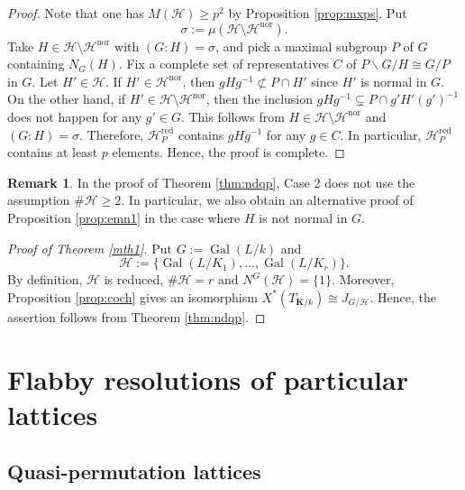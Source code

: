 \documentclass[12pt]{amsart}
\theoremstyle{plain}
\theoremstyle{definition}
\newtheorem{rem}[thm]{Remark}
\numberwithin{thm}{section}
\numberwithin{equation}{section}
\newcommand{\bK}{\mathbf{K}}
\newcommand{\cH}{\mathcal{H}}
\DeclareMathOperator{\Gal}{Gal}
\DeclareMathOperator{\red}{red}
\DeclareMathOperator{\nor}{nor}
\begin{document}
\begin{proof}
Note that one has $M(\cH)\geq p^{2}$ by Proposition \ref{prop:mxps}. Put
\begin{equation*}
\sigma:=\mu(\cH\setminus \cH^{\nor}). 
\end{equation*}
Take $H\in \cH \setminus \cH^{\nor}$ with $(G:H)=\sigma$, and pick a maximal subgroup $P$ of $G$ containing $N_{G}(H)$. Fix a complete set of representatives $C$ of $P\backslash G/H\cong G/P$ in $G$. Let $H'\in \cH$. If $H'\in \cH^{\nor}$, then $gHg^{-1}\not\subset P\cap H'$ since $H'$ is normal in $G$. On the other hand, if $H'\in \cH \setminus \cH^{\nor}$, then the inclusion $gHg^{-1}\subsetneq P\cap g'H'(g')^{-1}$ does not happen for any $g'\in G$. This follows from $H\in \cH \setminus \cH^{\nor}$ and $(G:H)=\sigma$. Therefore, $\cH_{P}^{\red}$ contains $gHg^{-1}$ for any $g\in C$. In particular, $\cH_{P}^{\red}$ contains at least $p$ elements. Hence, the proof is complete.  
\end{proof}

\begin{rem}
In the proof of Theorem \ref{thm:ndqp}, Case 2 does not use the assumption $\#\cH \geq 2$. In particular, we also obtain an alternative proof of Proposition \ref{prop:emn1} in the case where $H$ is not normal in $G$. 
\end{rem}

\begin{proof}[Proof of Theorem \ref{mth1}]
Put $G:=\Gal(L/k)$ and
\begin{equation*}
\cH:=\{\Gal(L/K_{1}),\ldots,\Gal(L/K_{r})\}. 
\end{equation*}
By definition, $\cH$ is reduced, $\#\cH=r$ and $N^{G}(\cH)=\{1\}$. Moreover, Proposition \ref{prop:coch} gives an isomorphism $X^{*}(T_{\bK/k})\cong J_{G/\cH}$. Hence, the assertion follows from Theorem \ref{thm:ndqp}. 
\end{proof}

\section{Flabby resolutions of particular lattices}\label{sect:flrs}

\subsection{Quasi-permutation lattices}
\end{document}
